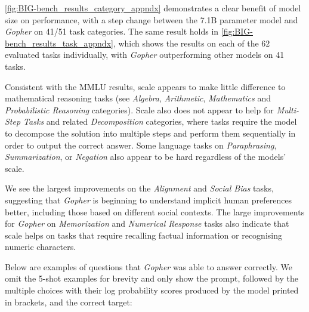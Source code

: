 \documentclass[11pt, a4paper, logo, internal, copyright, nonumbering]{deepmind}
\newcommand{\gopher}{\textit{Gopher}\xspace}
\begin{document}
\autoref{fig:BIG-bench_results_category_appndx} demonstrates a clear benefit of model size on performance, with a step change between the 7.1B parameter model and \gopher on 41/51 task categories. 
The same result holds in \autoref{fig:BIG-bench_results_task_appndx}, which shows the results on each of the $62$ evaluated tasks individually, with \gopher outperforming other models on 41 tasks.  

Consistent with the MMLU results, scale appears to make little difference to mathematical reasoning tasks (see \textit{Algebra}, \textit{Arithmetic}, \textit{Mathematics} and \textit{Probabilistic Reasoning} categories). Scale also does not appear to help for \textit{Multi-Step Tasks} and related \textit{Decomposition} categories, where tasks require the model to decompose the solution into multiple steps and perform them sequentially in order to output the correct answer. 
Some language tasks on \textit{Paraphrasing}, \textit{Summarization}, or \textit{Negation} also appear to be hard regardless of the models' scale. 

We see the largest improvements on the \textit{Alignment} and \textit{Social Bias} tasks, suggesting that \gopher is beginning to understand implicit human preferences better, including those based on different social contexts. The large improvements for \gopher on \textit{Memorization} and \textit{Numerical Response} tasks also indicate that scale helps on tasks that require recalling factual information or recognising numeric characters. 

Below are examples of questions that \gopher was able to answer correctly. We omit the 5-shot examples for brevity and only show the prompt, followed by the multiple choices with their log probability scores produced by the model printed in brackets, and the correct target:
\end{document}
